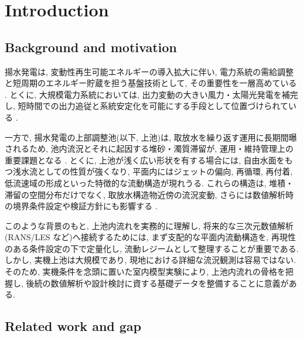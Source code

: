 \section{Introduction}
\label{sec:introduction}

\subsection{Background and motivation}

揚水発電は, 変動性再生可能エネルギーの導入拡大に伴い, 電力系統の需給調整と短周期のエネルギー貯蔵を担う基盤技術として, その重要性を一層高めている \cite{rehmanPumpedHydroEnergy2015,huntExistingNewArrangements2020}. とくに, 大規模電力系統においては, 出力変動の大きい風力・太陽光発電を補完し, 短時間での出力追従と系統安定化を可能にする手段として位置づけられている \cite{huntExistingNewArrangements2020}.

一方で, 揚水発電の上部調整池(以下, 上池)は, 取放水を繰り返す運用に長期間曝されるため, 池内流況とそれに起因する堆砂・濁質滞留が, 運用・維持管理上の重要課題となる \cite{mullerInfluenceOutflowSequences2012,mullerExperimentsEffectInflow2017,jenzeralthausSedimentEvacuationReservoirs2015}. とくに, 上池が浅く広い形状を有する場合には, 自由水面をもつ浅水流としての性質が強くなり, 平面内にはジェットの偏向, 再循環, 再付着, 低流速域の形成といった特徴的な流動構造が現れうる. これらの構造は, 堆積・滞留の空間分布だけでなく, 取放水構造物近傍の流況変動, さらには数値解析時の境界条件設定や検証方針にも影響する \cite{dufresneExperimentalInvestigationFlow2010,camnasioExperimentalStudyVelocity2011}.

このような背景のもと, 上池内流れを実務的に理解し, 将来的な三次元数値解析(RANS/LES など)へ接続するためには, まず支配的な平面内流動構造を, 再現性のある条件設定の下で定量化し, 流動レジームとして整理することが重要である. しかし, 実機上池は大規模であり, 現地における詳細な流況観測は容易ではない. そのため, 実機条件を念頭に置いた室内模型実験により, 上池内流れの骨格を把握し, 後続の数値解析や設計検討に資する基礎データを整備することに意義がある.

\subsection{Related work and gap}

